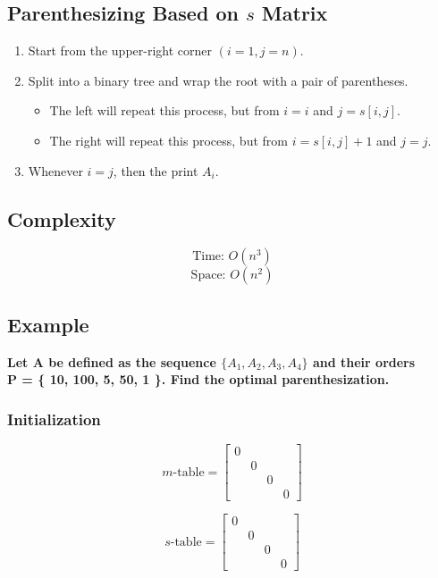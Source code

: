 \subsection*{Parenthesizing Based on $s$ Matrix}
\begin{enumerate}
	\item Start from the upper-right corner $(i = 1, j = n)$.
	\item Split into a binary tree and wrap the root with a pair of parentheses.
	\begin{itemize}
		\item The left will repeat this process, but from $i = i$ and $j = s[i,j]$.
		\item The right will repeat this process, but from $i= s[i,j] + 1$ and $j = j$.
	\end{itemize}
	\item Whenever $i = j$, then the print $A_i$.
\end{enumerate}
\subsection*{Complexity}
$$
\text{Time: } O(n^3)
$$
$$
\text{Space: } O(n^2)
$$

\subsection{Example}
\textbf{Let A be defined as the sequence $\{ A_1, A_2, A_3, A_4 \}$ and their orders\\ P = \{ 10, 100, 5, 50, 1  \}. Find the optimal parenthesization.}

\subsubsection*{Initialization}
\begin{minipage}{0.5\linewidth}
	$$
	m\text{-table}=
	\begin{bmatrix}
	0	&		&		&		\\
	&	0	&		&			\\
	&		&	0	&				\\			
	&		&		&	0
	\end{bmatrix}
	$$
\end{minipage}
\begin{minipage}{0.5\linewidth}
	$$
	s\text{-table}=
	\begin{bmatrix}
	0	&		&		&		\\
	&	0	&		&			\\
	&		&	0	&				\\			
	&		&		&	0
	\end{bmatrix}
	$$
\end{minipage}

